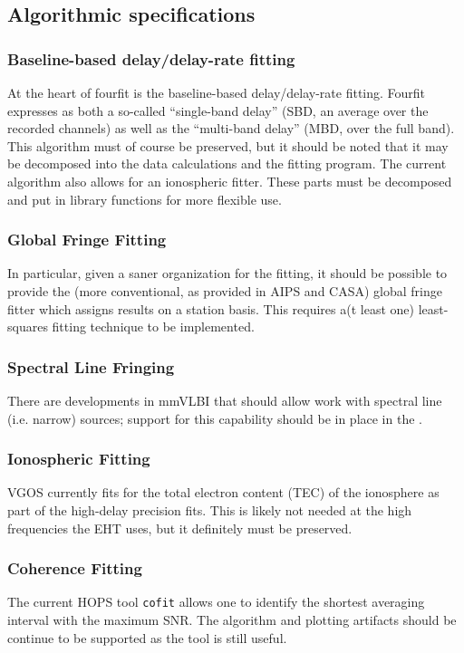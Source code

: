 \subsection{Algorithmic specifications}
\label{sec:algospecs}

\subsubsection{Baseline-based delay/delay-rate fitting}
\label{sec:fringing}
At the heart of fourfit is the baseline-based delay/delay-rate fitting.
Fourfit expresses as both a so-called ``single-band delay'' (SBD, an average
over the recorded channels) as well as the ``multi-band delay'' (MBD, over the
full band).  This algorithm must of course be preserved, but it should
be noted that it may be decomposed into the data calculations and the fitting
program.  The current algorithm also allows for an ionospheric fitter.
These parts must be decomposed and put in library functions for more flexible
use.

\subsubsection{Global Fringe Fitting}
\label{sec:globalfringe}
In particular, given a saner organization for the fitting, it should be
possible to provide the (more conventional, as provided in AIPS and CASA)
global fringe fitter which assigns results on a station basis.  This requires
a(t least one) least-squares fitting technique to be implemented.

\subsubsection{Spectral Line Fringing}
\label{sec:specline}
There are developments in mmVLBI that should allow work with spectral line
(i.e. narrow) sources; support for this capability should be in place in
the \nuHOPS.

\subsubsection{Ionospheric Fitting}
\label{sec:ionosphere}
VGOS currently fits for the total electron content (TEC) of the ionosphere
as part of the high-delay precision fits.  This is likely not needed at
the high frequencies the EHT uses, but it definitely must be preserved.

\subsubsection{Coherence Fitting}
\label{sec:cofit}
The current HOPS tool \texttt{cofit} allows one to identify the shortest
averaging interval with the maximum SNR.  The algorithm and plotting
artifacts should be continue to be supported as the tool is still useful.

